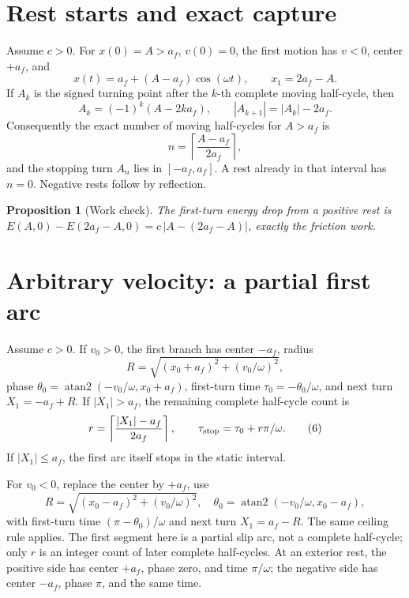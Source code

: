 \documentclass[10pt]{article}
\newtheorem{proposition}{Proposition}
\begin{document}
\section{Rest starts and exact capture}
Assume \(c>0\).  For \(x(0)=A>a_f\), \(v(0)=0\), the first motion has \(v<0\), center
\(+a_f\), and
\begin{equation}
 x(t)=a_f+(A-a_f)\cos(\omega t),\qquad x_1=2a_f-A. \tag{3}
\end{equation}
If \(A_k\) is the signed turning point after the \(k\)-th complete moving
half-cycle, then
\begin{equation}
 A_k=(-1)^k(A-2ka_f),\qquad |A_{k+1}|=|A_k|-2a_f. \tag{4}
\end{equation}
Consequently the exact number of moving half-cycles for \(A>a_f\) is
\begin{equation}
 n=\left\lceil\frac{A-a_f}{2a_f}\right\rceil, \tag{5}
\end{equation}
and the stopping turn \(A_n\) lies in \([-a_f,a_f]\).  A rest already in
that interval has \(n=0\).  Negative rests follow by reflection.

\begin{proposition}[Work check]
The first-turn energy drop from a positive rest is
\(E(A,0)-E(2a_f-A,0)=c\,|A-(2a_f-A)|\), exactly the friction work.
\end{proposition}

\section{Arbitrary velocity: a partial first arc}
Assume \(c>0\).  If \(v_0>0\), the first branch has center \(-a_f\), radius
\[
 R=\sqrt{(x_0+a_f)^2+(v_0/\omega)^2},
\]
phase \(\theta_0=\operatorname{atan2}(-v_0/\omega,x_0+a_f)\), first-turn
time \(\tau_0=-\theta_0/\omega\), and next turn \(X_1=-a_f+R\).  If
\(|X_1|>a_f\), the remaining complete half-cycle count is
\[
 r=\left\lceil\frac{|X_1|-a_f}{2a_f}\right\rceil,
\qquad \tau_{\rm stop}=\tau_0+r\pi/\omega. \tag{6}
\]
If \(|X_1|\le a_f\), the first arc itself stops in the static interval.

For \(v_0<0\), replace the center by \(+a_f\), use
\[
 R=\sqrt{(x_0-a_f)^2+(v_0/\omega)^2},\quad
 \theta_0=\operatorname{atan2}(-v_0/\omega,x_0-a_f),
\]
with first-turn time \((\pi-\theta_0)/\omega\) and next turn
\(X_1=a_f-R\).  The same ceiling rule applies.  The first segment here is a
partial slip arc, not a complete half-cycle; only \(r\) is an integer count of
later complete half-cycles.  At an exterior rest, the positive side has center
\(+a_f\), phase zero, and time \(\pi/\omega\); the negative side has center
\(-a_f\), phase \(\pi\), and the same time.
\end{document}
